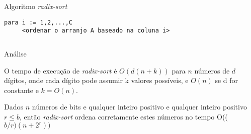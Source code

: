\begin{frame}[fragile]{Algoritmo {\em radix-sort}}
\begin{lstlisting}
para i := 1,2,...,C
     <ordenar o arranjo A baseado na coluna i>
\end{lstlisting}

\def\dheight{0.5cm}
\def\dwidth{0.35cm}
\def\queue#1#2#3#4{
  \node[rectangle,draw] at (0,0.5*\dheight) {\tiny 3};
  \node[rectangle,draw] at (\dwidth,0.5*\dheight) {\tiny 2};
  \node[rectangle,draw] at (2*\dwidth,0.5*\dheight) {\tiny 1};
  \foreach \i/\ddd/\dd/\d in {#4} {
      \node[fill=red!#1] at (0,-\dheight*\i) {\ddd};
      \node[fill=red!#2] at (\dwidth,-\dheight*\i) {\dd};
      \node[fill=red!#3] at (2*\dwidth,-\dheight*\i) {\d};
  }
}
\begin{columns}
\begin{column}{.2\textwidth}
\end{column}

\begin{column}{.2\textwidth}
\end{column}


\begin{column}{.2\textwidth}
\end{column}


\begin{column}{.2\textwidth}
\end{column}
\end{columns}
\end{frame}

\begin{frame}{Análise}

\begin{lema}
O tempo de execução de {\em radix-sort} é \alert{$O(d(n+k))$} para $n$ números
de $d$ dígitos, onde cada dígito pode assumir k valores possíveis, e
\alert{$O(n)$} se d for constante e $k = O(n)$.
\end{lema}

\begin{lema}
Dados $n$ números de bits e qualquer inteiro positivo e qualquer
inteiro positivo $r \leq b$, então {\em radix-sort} ordena
corretamente estes números no tempo \alert{O(($b\slash r)(n + 2^r))$}
\end{lema}

\end{frame}

